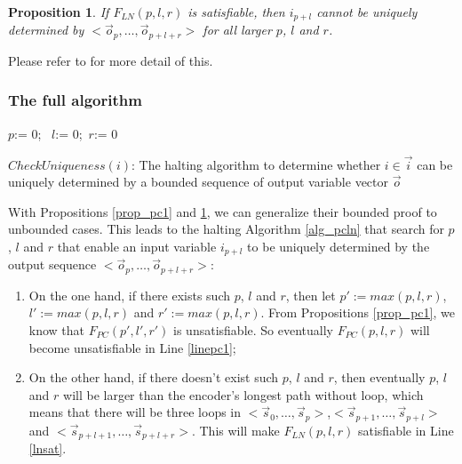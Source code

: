 \documentclass[twocolumn]{article}
\newtheorem{proposition}{Proposition}
\begin{document}
\begin{proposition}\label{prop_ln1}
If $F_{LN}(p,l,r)$ is satisfiable,
then $i_{p+l}$ cannot be uniquely determined by $<\vec{o}_{p},\dots,\vec{o}_{p+l+r}>$ for all larger $p$, $l$ and $r$.
\end{proposition}

Please refer to \cite{ShenTCAD11} for more detail of this.

\subsubsection{The full algorithm}\label{subsub_algo}

\begin{algorithm}[t]
\SetAlgoVlined
{}
$p$:= 0; ~$l$:= 0;~$r$:= 0\;
\caption{$CheckUniqueness(i)$: The halting algorithm to determine 
whether $i\in\vec{i}$ can be uniquely determined by a bounded sequence of output variable vector $\vec{o}$}
\label{alg_pcln}
\end{algorithm}


With Propositions \ref{prop_pc1} and \ref{prop_ln1},
we can generalize their bounded proof to unbounded cases.
This leads to the halting
Algorithm \ref{alg_pcln} that search for $p$, $l$ and $r$ that enable
an input variable $i_{p+l}$ to be uniquely determined by the output sequence $<\vec{o}_{p},\dots,\vec{o}_{p+l+r}>$:
\begin{enumerate}
 \item 
On the one hand, 
if there exists such $p$, $l$ and $r$,
then let $p':=max(p,l,r)$, $l':=max(p,l,r)$ and $r':=max(p,l,r)$.
From Propositions \ref{prop_pc1},
we know that $F_{PC}(p',l',r')$ is unsatisfiable.
So eventually $F_{PC}(p,l,r)$ will become unsatisfiable in Line \ref{linepc1};
 \item
On the other hand,
if there doesn't exist such $p$, $l$ and $r$,
then eventually $p$, $l$ and $r$ will be larger than the encoder's longest path without loop,
which means that there will be three loops in $<\vec{s}_{0},\dots,\vec{s}_{p}>$,$<\vec{s}_{p+1},\dots,\vec{s}_{p+l}>$ and 
$<\vec{s}_{p+l+1},\dots,\vec{s}_{p+l+r}>$.
This will make $F_{LN}(p,l,r)$ satisfiable in Line \ref{lnsat}.
\end{enumerate}
\end{document}
